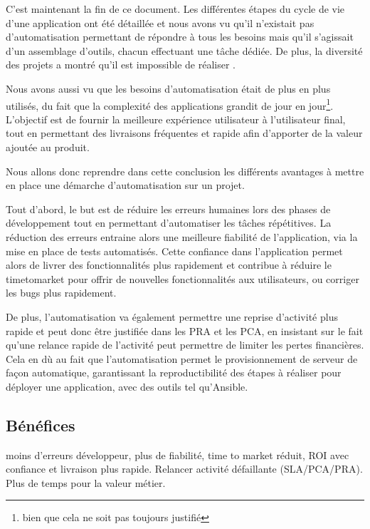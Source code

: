 C'est maintenant la fin de ce document. Les différentes étapes du cycle de vie d'une application ont été détaillée et nous avons vu qu'il n'existait pas d'automatisation  permettant de répondre à tous les besoins mais qu'il s'agissait d'un assemblage d'outils, chacun effectuant une tâche dédiée. De plus, la diversité des projets a montré qu'il est impossible de réaliser .

Nous avons aussi vu que les besoins d'automatisation était de plus en plus utilisés, du fait que la complexité des applications grandit de jour en jour\footnote{bien que cela ne soit pas toujours justifié}. L'objectif est de fournir la meilleure expérience utilisateur à l'utilisateur final, tout en permettant des livraisons fréquentes et rapide afin d'apporter de la valeur ajoutée au produit.


Nous allons donc reprendre dans cette conclusion les différents avantages à mettre en place une démarche d'automatisation sur un projet.

Tout d'abord, le but est de réduire les erreurs humaines lors des phases de développement tout en permettant d'automatiser les tâches répétitives. La réduction des erreurs entraine alors une meilleure fiabilité de l'application, via la mise en place de tests automatisés. Cette confiance dans l'application permet alors de livrer des fonctionnalités plus rapidement et contribue à réduire le \gls{timetomarket} pour offrir de nouvelles fonctionnalités aux utilisateurs, ou corriger les bugs plus rapidement.

De plus, l'automatisation va également permettre une reprise d'activité plus rapide et peut donc être justifiée dans les \gls{PRA} et les \gls{PCA}, en insistant sur le fait qu'une relance rapide de l'activité peut permettre de limiter les pertes financières. Cela en dù au fait que l'automatisation permet le provisionnement de serveur de façon automatique, garantissant la reproductibilité des étapes à réaliser pour déployer une application, avec des outils tel qu'Ansible.


\subsection*{Bénéfices}


moins d'erreurs développeur, plus de fiabilité, time to market réduit, ROI avec confiance et livraison plus rapide. Relancer activité défaillante (SLA/PCA/PRA). Plus de temps pour la valeur métier. 

